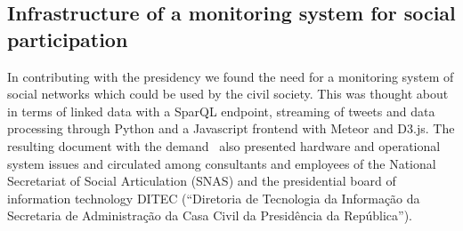 \begin{apendicesenv}
\subsection{Infrastructure of a monitoring system for social participation}
In contributing with the presidency we found the need for a monitoring system of social networks
which could be used by the civil society.
This was thought about in terms of linked data with a SparQL endpoint, streaming of tweets and data processing through Python
and a Javascript frontend with Meteor and D3.js.
The resulting document with the demand~\cite{sm} also presented hardware and operational system issues
and circulated among consultants and employees of the National Secretariat of Social Articulation (SNAS) and 
the presidential board of information technology DITEC (``Diretoria de Tecnologia da Informação da Secretaria de Administração da Casa Civil da Presidência da República'').


\end{apendicesenv}
